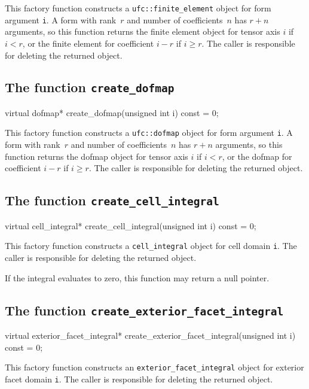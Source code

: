 This factory function constructs a \texttt{ufc::finite\_element}
object for form argument \texttt{i}. A form with rank~$r$ and number
of coefficients~$n$ has $r + n$ arguments, so this function returns
the finite element object for tensor axis $i$ if $i < r$, or the
finite element for coefficient $i - r$ if $i \geq r$.  The caller is
responsible for deleting the returned object.

\subsection{The function \texttt{create\_dofmap}}

\begin{code}
virtual dofmap*
create_dofmap(unsigned int i) const = 0;
\end{code}

This factory function constructs a \texttt{ufc::dofmap} object for
form argument \texttt{i}. A form with rank~$r$ and number of
coefficients~$n$ has $r + n$ arguments, so this function returns the
dofmap object for tensor axis $i$ if $i < r$, or the dofmap for
coefficient $i - r$ if $i \geq r$.  The caller is responsible for
deleting the returned object.

\subsection{The function \texttt{create\_cell\_integral}}

\begin{code}
virtual cell_integral*
create_cell_integral(unsigned int i) const = 0;
\end{code}

This factory function constructs a \texttt{cell\_integral} object for
cell domain \texttt{i}. The caller is responsible for deleting the
returned object.

If the integral evaluates to zero, this function may return a null
pointer.

\subsection{The function \texttt{create\_exterior\_facet\_integral}}

\begin{code}
virtual exterior_facet_integral*
create_exterior_facet_integral(unsigned int i) const = 0;
\end{code}

This factory function constructs an \texttt{exterior\_facet\_integral}
object for exterior facet domain \texttt{i}. The caller is responsible
for deleting the returned object.

